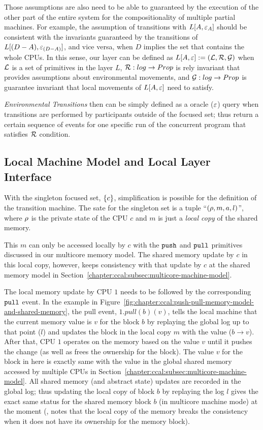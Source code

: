 Those assumptions are also need to be able to guaranteed by the execution of the other part of the entire system for 
the compositionality of multiple partial machines.
For example, the assumption of transitions with $L[A, {\varepsilon}_{A}]$ should be consistent with the invariants guaranteed by the transitions of $L[(D - A), {\varepsilon}_{(D-A)}]$, and vice versa, when $D$ implies the set that contains the whole CPUs.
In this sense, our layer can be defined as
$L[A, {\varepsilon}] := (\mathcal{L}, \mathcal{R},\mathcal{G})$ when $\mathcal{L}$ is a set of primitives in the layer $L$,
$\mathcal{R} : log \rightarrow Prop$ is  rely invariant that provides assumptions about  environmental movements,
and $\mathcal{G}: log \rightarrow Prop$ is guarantee invariant that local movements of $L[A, {\varepsilon}]$ need to satisfy.

\emph{Environmental Transitions} then can be simply defined as 
a oracle (${\varepsilon}$) query when  transitions are performed by participants outside of the focused set;
thus return a certain sequence of events for one specific run of the concurrent program 
that satisfies $\mathcal{R}$ condition.

\subsection{Local Machine Model and Local Layer Interface}
\label{chapter:ccal:subsec:local-layer-interface}

With the singleton focused set, $\{c\}$, 
simplification is possible for the definition of the transition machine.
The sate for the singleton set is a tuple ``$(\rho, m, a, l)$'',
where $\rho$ is the private state of the CPU $c$
and $m$ is just a \emph{local copy} of the shared memory.


This $m$ can only be accessed locally by $c$ with the ${\mathrm{\texttt{push}}}$ and ${\mathrm{\texttt{pull}}}$ primitives discussed in our multicore memory model. 
The shared  memory update by $c$ in this local copy, however, 
keeps consistency with 
that update by $c$ at the shared memory model in
Section~\ref{chapter:ccal:subsec:multicore-machine-model}.

The local memory update by CPU $1$ needs to be followed by the corresponding ${\mathrm{\texttt{pull}}}$ event.
In the example in Figure~\ref{fig:chapter:ccal:push-pull-memory-model-and-shared-memory},
the pull event, $1.pull(b)(v)$, tells the local machine that the current memory value is 
$v$ for the block $b$ by replaying the global log up to that point ($l$)
and updates the block in the local copy $m$ with the value ($b \rightarrow v$). 
After that, CPU $1$ operates on the memory based on the value $v$ until it pushes the change (as well as frees the ownership for the block).
The value $v$ for the block in here is exactly same with the value in the global shared memory accessed by multiple CPUs in Section~\ref{chapter:ccal:subsec:multicore-machine-model}.
All shared memory (and abstract state) updates are recorded in the global log; thus
updating the local copy of block $b$ by replaying the log $l$ gives the exact same status for the shared memory block $b$ (in multicore machine mode) at the moment
(\ie, notes that the local copy of the memory breaks the consistency when it does not have its ownership for the memory block). 


